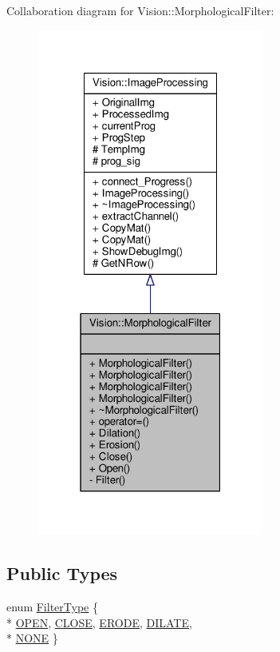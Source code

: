 Collaboration diagram for Vision\+:\+:Morphological\+Filter\+:\nopagebreak
\begin{figure}[H]
\begin{center}
\leavevmode
\includegraphics[width=211pt]{class_vision_1_1_morphological_filter__coll__graph}
\end{center}
\end{figure}
\subsection*{Public Types}
\begin{DoxyCompactItemize}
\item 
enum \hyperlink{class_vision_1_1_morphological_filter_a1f19c9cb13f0d68778c77d6fd0370868}{Filter\+Type} \{ \\*
\hyperlink{class_vision_1_1_morphological_filter_a1f19c9cb13f0d68778c77d6fd0370868afd436eed00afa15b23eeac4de3509303}{O\+P\+E\+N}, 
\hyperlink{class_vision_1_1_morphological_filter_a1f19c9cb13f0d68778c77d6fd0370868a0e01d9ebb7d53eaa2ae98ea36cc810f6}{C\+L\+O\+S\+E}, 
\hyperlink{class_vision_1_1_morphological_filter_a1f19c9cb13f0d68778c77d6fd0370868a4ca3c81298a713b3d1f279c9233e7547}{E\+R\+O\+D\+E}, 
\hyperlink{class_vision_1_1_morphological_filter_a1f19c9cb13f0d68778c77d6fd0370868afbd91b5e6d75b6bcfc8faca3f5da7c47}{D\+I\+L\+A\+T\+E}, 
\\*
\hyperlink{class_vision_1_1_morphological_filter_a1f19c9cb13f0d68778c77d6fd0370868a8bc137e512a8def100d5ce92af334438}{N\+O\+N\+E}
 \}
\end{DoxyCompactItemize}
